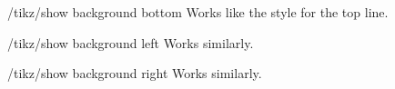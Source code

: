 \begin{stylekey}{/tikz/show background bottom}
  Works like the style for the top line.
\end{stylekey}
\begin{stylekey}{/tikz/show background left}
  Works similarly.
\end{stylekey}
\begin{stylekey}{/tikz/show background right}
  Works similarly.
\end{stylekey}



